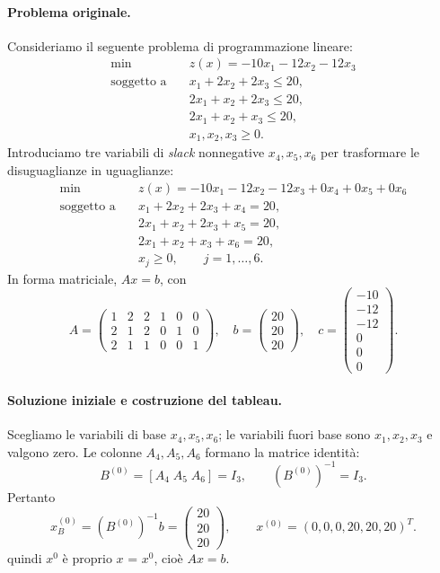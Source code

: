 \paragraph{Problema originale.}
Consideriamo il seguente problema di programmazione lineare:
\[
\begin{aligned}
\min\quad &z(x)=-10x_1-12x_2-12x_3\\
\text{soggetto a}\quad
&x_1+2x_2+2x_3\le 20,\\
&2x_1+x_2+2x_3\le 20,\\
&2x_1+x_2+x_3\le 20,\\
&x_1,x_2,x_3\ge0.
\end{aligned}
\]
Introduciamo tre variabili di \emph{slack} nonnegative $x_4,x_5,x_6$ per trasformare le disuguaglianze in uguaglianze:
\[
\begin{aligned}
\min\quad &z(x)=-10x_1-12x_2-12x_3+0x_4+0x_5+0x_6\\
\text{soggetto a}\quad
&x_1+2x_2+2x_3+x_4=20,\\
&2x_1+x_2+2x_3+x_5=20,\\
&2x_1+x_2+x_3+x_6=20,\\
&x_j\ge0,\qquad j=1,\ldots,6.
\end{aligned}
\]
In forma matriciale, $Ax=b$, con
\[
A=\begin{pmatrix}1&2&2&1&0&0\\2&1&2&0&1&0\\2&1&1&0&0&1\end{pmatrix},\quad
b=\begin{pmatrix}20\\20\\20\end{pmatrix},\quad
c=\begin{pmatrix}-10\\-12\\-12\\0\\0\\0\end{pmatrix}.
\]

\paragraph{Soluzione iniziale e costruzione del tableau.}
Scegliamo le variabili di base $x_4,x_5,x_6$; le variabili fuori base sono $x_1,x_2,x_3$ e valgono zero. Le colonne $A_4,A_5,A_6$ formano la matrice identit\`a:
\[
B^{(0)}=[A_4\;A_5\;A_6]=I_3,\qquad (B^{(0)})^{-1}=I_3.
\]
Pertanto
\[
x_B^{(0)}=(B^{(0)})^{-1}b=\begin{pmatrix}20\\20\\20\end{pmatrix},
\qquad x^{(0)}=(0,0,0,20,20,20)^T.
\]
quindi $x^{0}$ è proprio $x$ = $x^{0}$, cioè $Ax = b$.

